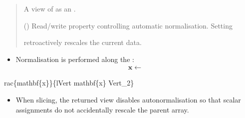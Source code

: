\documentclass[letterpaper,10pt,english]{sphinxmanual}
\begin{document}
\begin{fulllineitems}
\begin{quote}
\begin{description}
\begin{itemize}
\end{itemize}

\sphinxAtStartPar
A view of  as an {\hyperref[\detokenize{generated/photon_canon.optics:photon_canon.optics.IndexableProperty}]{}}.

\sphinxAtStartPar
{\hyperref[\detokenize{generated/photon_canon.optics:photon_canon.optics.IndexableProperty}]{}}

\sphinxAtStartPar
{} () \textendash{} 
\sphinxAtStartPar
Read/write property controlling automatic
normalisation.  Setting

\begin{sphinxVerbatim}[commandchars=\\\{\}]
  
\end{sphinxVerbatim}

\sphinxAtStartPar
retroactively rescales the current data.


\end{description}\end{quote}

\sphinxAtStartPar
{}
\begin{itemize}
\item {} 
\sphinxAtStartPar
Normalisation is performed along the :
\begin{equation*}
\begin{split}\mathbf{x} \leftarrow\end{split}
\end{equation*}
\end{itemize}

\sphinxAtStartPar
rac\{mathbf\{x\}\}\{lVert mathbf\{x\}
Vert\_2\}
\begin{itemize}
\item {} 
\sphinxAtStartPar
When slicing, the returned view disables auto\sphinxhyphen{}normalisation so that
scalar assignments do not accidentally rescale the parent array.

\end{itemize}

\sphinxAtStartPar
{}


\end{fulllineitems}
\end{document}
